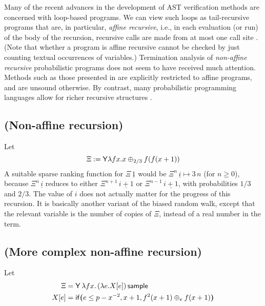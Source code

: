 Many of the recent advances in the development of AST verification methods \cite{DBLP:conf/pldi/ChenH20,DBLP:conf/cav/ChakarovS13,DBLP:conf/popl/FioritiH15,DBLP:journals/pacmpl/McIverMKK18,DBLP:conf/aplas/HuangFC18,DBLP:conf/popl/ChatterjeeNZ17,DBLP:journals/pacmpl/AgrawalC018,DBLP:conf/cav/ChatterjeeFG16,DBLP:conf/lics/OlmedoKKM16,DBLP:journals/pacmpl/Huang0CG19} are concerned with loop-based programs.
We can view such loops as tail-recursive programs that are, in particular, \emph{affine recursive}, i.e., 
in each evaluation (or run) of the body of the recursion, recursive calls are made from at most one call site \cite[\S 4.1]{DBLP:journals/toplas/LagoG19}.
(Note that whether a program is affine recursive cannot be checked by just counting textual occurrences of variables.)
Termination analysis of \emph{non-affine recursive} probabilistic programs does not seem to have received much attention.
Methods such as those presented in \cite{DBLP:journals/toplas/LagoG19} are explicitly restricted to affine programs, and are unsound otherwise.
By contrast, many probabilistic programming languages allow for richer recursive structures \cite{DBLP:conf/pkdd/TolpinMW15,DBLP:conf/uai/GoodmanMRBT08,DBLP:journals/corr/MansinghkaSP14}.

\subsection*{ (Non-affine recursion)}
Let 
\[
\Xi := \mathsf{Y} \lambda f x. x \oplus_{2/3} f (f (x + 1))
\] 
A suitable sparse ranking function for $\Xi \, \underline 1$ would be $\Xi^n \, \underline i \mapsto 3 \, n$ (for $n \geq 0$), because $\Xi^n \, \underline i$ reduces to either $\Xi^{n+1} \, \underline{i+1}$ or $\Xi^{n-1} \, \underline{i+1}$, with probabilities $1/3$ and $2/3$. The value of $i$ does not actually matter for the progress of this recursion. It is basically another variant of the biased random walk, except that the relevant variable is the number of copies of $\Xi$, instead of a real number in the term.


\subsection*{ (More complex non-affine recursion)}
Let
\begin{align*}
\Xi & = \mathsf{Y}\, \lambda f x.\, (\lambda e. X[e]) \, \mathsf{sample} \\
X[e] & = \mathsf{if}\boldsymbol{(}e \leq p - x^{-2}, x+1, f^2(x+1) \oplus_e f(x+1)\boldsymbol{)}
\end{align*}

